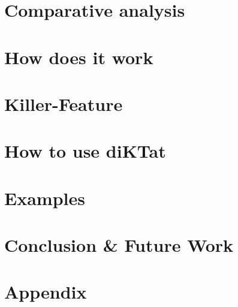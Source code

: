 \documentclass[acmlarge, screen, nonacm]{acmart}
\begin{document}
\section{Comparative analysis}
\label{sec:compare}


\section{How does it work}
\label{sec:work}


\section{Killer-Feature}
\label{sec:feature}


\section{How to use diKTat}
\label{sec:download}


\section{Examples}
\label{sec:examples}


\section{Conclusion \& Future Work}
\label{sec:conclusion}


\newpage
\nocite{*}



\newpage
\section{Appendix}
\label{sec:appendix}

\end{document}
